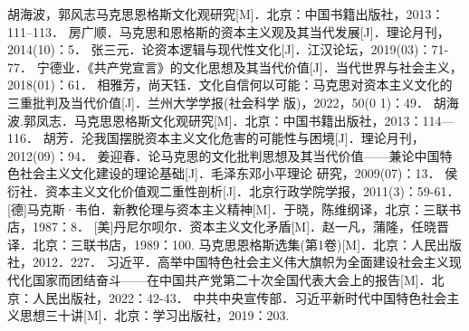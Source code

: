 \documentclass[a4paper]{ctexart}
\begin{document}
\setcounter{page}{1}

\newpage
\fontsize{10pt}{13pt}\selectfont
\begin{thebibliography}{99}%
  胡海波，郭风志马克思恩格斯文化观研究[M]．北京：中国书籍出版社，2013：111--113．
  房广顺．马克思和恩格斯的资本主义观及其当代发展[J]．理论月刊，2014(10)：5．
  张三元．论资本逻辑与现代性文化[J]．江汉论坛，2019(03)：71-77．
  宁德业．《共产党宣言》的文化思想及其当代价值[J]．当代世界与社会主义，2018(01)：61．
  相雅芳，尚天钰．文化自信何以可能：马克思对资本主义文化的三重批判及当代价值[J]．兰州大学学报(社会科学 版)，2022，50(0 1)：49．
  胡海波.郭凤志．马克思恩格斯文化观研究[M]．北京：中国书籍出版社，2013：114—116．
  胡芳．沦我国摆脱资本主义文化危害的可能性与困境[J]．理论月刊，2012(09)：94．
  姜迎春．论马克思的文化批判思想及其当代价值——兼论中国特色社会主义文化建设的理论基础[J]．毛泽东邓小平理论 研究，2009(07)：13．
  侯衍社．资本主义文化价值观二重性剖析[J]．北京行政学院学报，2011(3)：59-61．
  [德]马克斯·韦伯．新教伦理与资本主义精神[M]．于晓，陈维纲译，北京：三联书店，1987：8．
  [美]丹尼尔呗尔．资本主义文化矛盾[M]．赵一凡，蒲隆，任晓晋译．北京：三联书店，1989：100.
  马克思恩格斯选集(第1卷)[M]．北京：人民出版社，2012．227．
  习近平．高举中国特色社会主义伟大旗帜\quad 为全面建设社会主义现代化国家而团结奋斗------在中国共产党第二十次全国代表大会上的报告[M]．北京：人民出版社，2022：42-43．
  中共中央宣传部．习近平新时代中国特色社会主义思想三十讲[M]．北京：学习出版社，2019：203.
\end{thebibliography}
\end{document}
